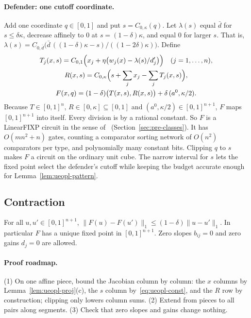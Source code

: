 \paragraph{Defender: one cutoff coordinate.} Add one coordinate $q\in[0,1]$ and put
$s=C_{0,\kappa}(q)$. Let $\lambda(s)$ equal $\bar d$ for $s\le\delta\kappa$, decrease affinely to $0$ at
$s=(1-\delta)\kappa$, and equal $0$ for larger $s$. That is,
$\lambda(s)=C_{0,\bar d}\bigl(\bar d\,((1-\delta)\kappa-s)/((1-2\delta)\kappa)\bigr)$. Define
\begin{gather*}
  T_j(x,s)=C_{0,1}\Bigl(x_j+\eta\bigl(w_j(x)-\lambda(s)/d'_j\bigr)\Bigr)\quad(j=1,\dots,n),\\
  R(x,s)=C_{0,\kappa}\Bigl(s+\sum_jx_j-\sum_jT_j(x,s)\Bigr),\\
  F(x,q)=(1-\delta)\bigl(T(x,s),R(x,s)\bigr)+\delta\,(a^0,\kappa/2).
\end{gather*}
Because $T\in[0,1]^n$, $R\in[0,\kappa]\subseteq[0,1]$ and $(a^0,\kappa/2)\in[0,1]^{n+1}$, $F$ maps
$[0,1]^{n+1}$ into itself. Every division is by a rational constant. So $F$ is a LinearFIXP circuit in
the sense of~\cite{fgms18} (Section~\ref{sec:pre-classes}). It has $O(mn^2+n)$ gates, counting a
comparator sorting network of $O(n^2)$ comparators per type, and polynomially many constant bits.
Clipping $q$ to $s$ makes $F$ a circuit on the ordinary unit cube. The narrow interval for $s$ lets the
fixed point select the defender's cutoff while keeping the budget accurate enough for
Lemma~\ref{lem:ueopl-pattern}.

\subsection{Contraction}

\begin{lemma}\label{lem:ueopl-contraction}
\statusrefereed
For all $u,u'\in[0,1]^{n+1}$, $\|F(u)-F(u')\|_1\le(1-\delta)\|u-u'\|_1$. In particular $F$ has a unique
fixed point in $[0,1]^{n+1}$. Zero slopes $b_{ij}=0$ and zero gains $d_j=0$ are allowed.
\end{lemma}

\paragraph{Proof roadmap.} (1) On one affine piece, bound the Jacobian column by column: the $x$
columns by Lemma~\ref{lem:ueopl-proj}(c), the $s$ column by~\eqref{eq:ueopl-const}, and the $R$ row by
construction; clipping only lowers column sums. (2) Extend from pieces to all pairs along segments.
(3) Check that zero slopes and gains change nothing.

